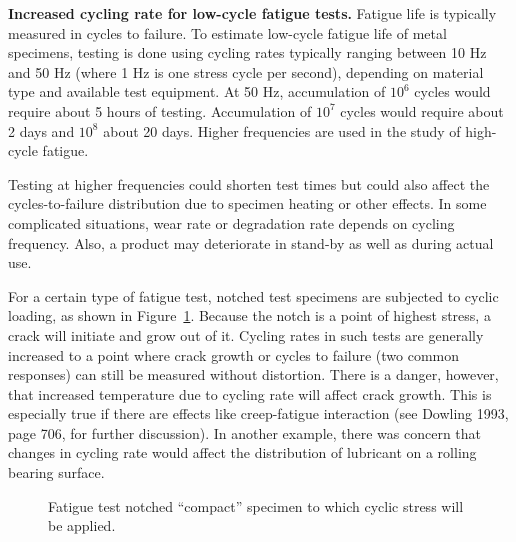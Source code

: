 \begin{example}
{\bf Increased cycling rate for low-cycle fatigue tests.}
Fatigue life is typically measured in cycles to failure.  To estimate
low-cycle fatigue life of metal specimens, testing is done using cycling
rates typically ranging between 10 Hz and 50 Hz (where 1 Hz is one
stress cycle per second), depending on material type and available
test equipment. At 50 Hz,
accumulation of $10^{6}$ cycles would require about 5 hours of testing.
Accumulation of  $10^{7}$ cycles would require about 2 days and
$10^{8}$ about 20 days. Higher frequencies are used in the study
of high-cycle fatigue.
\end{example}
Testing at higher frequencies could shorten test times but could also
affect the cycles-to-failure distribution due to specimen heating or
other effects. In some complicated
situations, wear rate or degradation rate depends on cycling frequency.
Also, a product may deteriorate in stand-by as well as during actual use.

For a certain type of fatigue test, notched test specimens are
subjected to cyclic loading, as shown in
Figure~\ref{figure:fatigue.test.setupfig.ps}. Because the notch is a point of
highest stress, a crack will initiate and grow out of it.
Cycling rates in such tests are generally increased to a point where
crack growth or cycles to failure (two common responses)
can still be measured without
distortion. There is a danger, however, that increased temperature 
due to cycling rate will affect crack growth.  This
is especially true if there are effects like creep-fatigue interaction
(see Dowling 1993, page 706, for further discussion).  In another
example, there was concern that changes in cycling rate would affect
the distribution of lubricant on a rolling bearing surface.
\begin{figure}
\caption{Fatigue test notched ``compact'' specimen to which cyclic stress will be applied.}
\label{figure:fatigue.test.setupfig.ps}
\end{figure}

